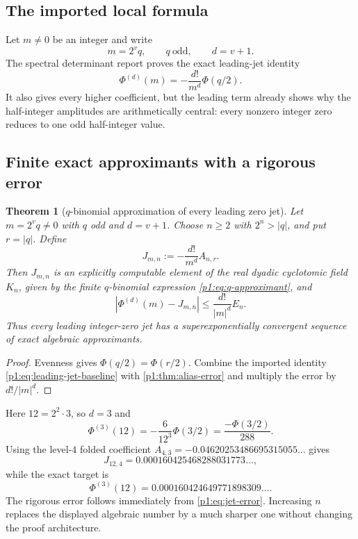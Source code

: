 \documentclass[11pt,oneside]{article}
\newtheorem{theorem}{Theorem}[section]
\theoremstyle{definition}
\theoremstyle{remark}
\newcommand{\PhiU}{\Phi}
\begin{document}
\subsection{The imported local formula}

Let $m\ne0$ be an integer and write
\begin{equation}\label{p1:eq:m-v-q}
 m=2^vq,
 \qquad q\ \text{odd},
 \qquad d=v+1.
\end{equation}
The spectral determinant report proves the exact leading-jet identity
\begin{equation}\label{p1:eq:leading-jet-baseline}
 \PhiU^{(d)}(m)=-\frac{d!}{m^d}\PhiU(q/2).
\end{equation}
It also gives every higher coefficient, but the leading term already shows why
the half-integer amplitudes are arithmetically central: every nonzero integer
zero reduces to one odd half-integer value.

\subsection{Finite exact approximants with a rigorous error}

\begin{theorem}[$q$-binomial approximation of every leading zero jet]\label{p1:thm:jet-approximant}
Let $m=2^vq\ne0$ with $q$ odd and $d=v+1$.  Choose $n\ge2$ with
$2^n>|q|$, and put $r=|q|$.  Define
\begin{equation}\label{p1:eq:J-m-n}
 J_{m,n}:=-\frac{d!}{m^d}A_{n,r}.
\end{equation}
Then $J_{m,n}$ is an explicitly computable element of the real dyadic
cyclotomic field $K_n$, given by the finite $q$-binomial expression
\eqref{p1:eq:q-approximant}, and
\begin{equation}\label{p1:eq:jet-error}
 \boxed{
 |\PhiU^{(d)}(m)-J_{m,n}|
 \le\frac{d!}{|m|^d}E_n.}
\end{equation}
Thus every leading integer-zero jet has a superexponentially convergent sequence
of exact algebraic approximants.
\end{theorem}

\begin{proof}
Evenness gives $\PhiU(q/2)=\PhiU(r/2)$.  Combine the imported identity
\eqref{p1:eq:leading-jet-baseline} with \cref{p1:thm:alias-error} and multiply the
error by $d!/|m|^d$.
\end{proof}

\begin{example}[The zero at $m=12$]\label{p1:ex:jet-12}
Here $12=2^2\cdot3$, so $d=3$ and
\[
 \PhiU^{(3)}(12)=-\frac{6}{12^3}\PhiU(3/2)
 =\frac{-\PhiU(3/2)}{288}.
\]
Using the level-$4$ folded coefficient
$A_{4,3}=-0.04620253486695315055\ldots$ gives
\[
 J_{12,4}=0.000160425468288031773\ldots,
\]
while the exact target is
\[
 \PhiU^{(3)}(12)=0.000160424649771898309\ldots.
\]
The rigorous error follows immediately from \eqref{p1:eq:jet-error}.  Increasing
$n$ replaces the displayed algebraic number by a much sharper one without
changing the proof architecture.
\end{example}
\end{document}
